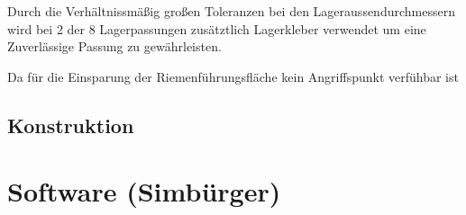     Durch die Verhältnissmäßig großen Toleranzen bei den Lageraussendurchmessern wird bei 2 der 8 Lagerpassungen zusätztlich Lagerkleber verwendet um eine Zuverlässige Passung zu gewährleisten.

    Da für die Einsparung der Riemenführungsfläche kein Angriffspunkt verfühbar ist 


\subsection{Konstruktion}

\section{Software (Simbürger)}
